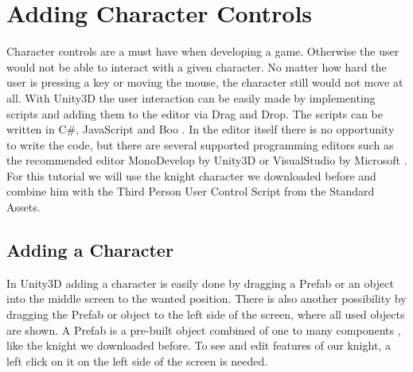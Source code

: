 \documentclass[12pt, a4paper, titlepage]{article}
\newcommand{\csh}{C{\#}}
\begin{document}
\section{Adding Character Controls}

Character controls are a must have when developing a game. Otherwise the user would not be able to interact with a given character. No matter how hard the user is pressing a key or moving the mouse, the character still would not move at all.
With Unity3D the user interaction can be easily made by implementing scripts and adding them to the editor via Drag and Drop. The scripts can be written in \csh, JavaScript and Boo \cite{b1}. In the editor itself there is no opportunity to write the code, but there are several supported programming editors such as the recommended editor MonoDevelop by Unity3D or VisualStudio by Microsoft \cite{b1}. \\
For this tutorial we will use the knight character we downloaded before and combine him with the Third Person User Control Script from the Standard Assets.

\subsection{Adding a Character}

In Unity3D adding a character is easily done by dragging a Prefab or an object into the middle screen to the wanted position. There is also another possibility by dragging the Prefab or object to the left side of the screen, where all used objects are shown. A Prefab is a pre-built object combined of one to many components \cite{b2}, like the knight we downloaded before.
To see and edit features of our knight, a left click on it on the left side of the screen is needed. 
\end{document}
